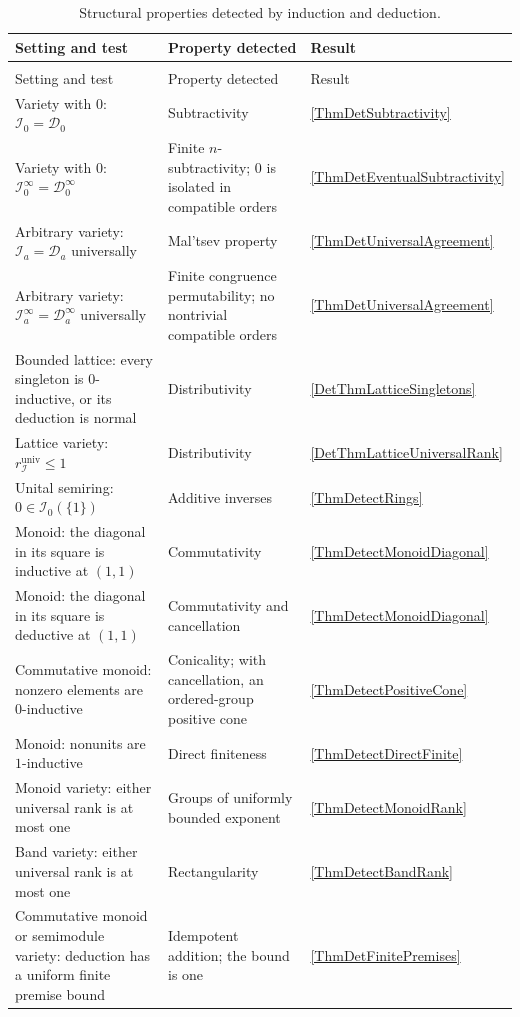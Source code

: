 \documentclass[12pt,english]{amsart}
\theoremstyle{definition}
\numberwithin{equation}{section}
\theoremstyle{remark}
\begin{document}
\begingroup
\small
\setlength{\tabcolsep}{4pt}
\setlength{\LTcapwidth}{\textwidth}
\renewcommand{\arraystretch}{1.12}
\makeatletter
{}
\makeatother
\begin{longtable}{@{}>{\raggedright\arraybackslash}p{}>{\raggedright\arraybackslash}p{}l@{}}
\caption{Structural properties detected by induction and deduction.}
\label{TabDetection}\\
\toprule
Setting and test & Property detected & Result\\
\midrule
\endfirsthead
\multicolumn{3}{l}{\textit{Table~\ref{TabDetection}, continued}}\\
\toprule
Setting and test & Property detected & Result\\
\midrule
\endhead
\bottomrule
\endfoot
Variety with $0$: $\mathcal I_0=\mathcal D_0$
 & Subtractivity & \ref{ThmDetSubtractivity}\\
Variety with $0$: $\mathcal I_0^\infty=\mathcal D_0^\infty$
 & Finite $n$-subtractivity; $0$ is isolated in compatible orders
 & \ref{ThmDetEventualSubtractivity}\\
Arbitrary variety: $\mathcal I_a=\mathcal D_a$ universally
 & Mal'tsev property & \ref{ThmDetUniversalAgreement}\\
Arbitrary variety: $\mathcal I_a^\infty=\mathcal D_a^\infty$ universally
 & Finite congruence permutability; no nontrivial compatible orders
 & \ref{ThmDetUniversalAgreement}\\
Bounded lattice: every singleton is $0$-inductive, or its deduction is normal
 & Distributivity & \ref{DetThmLatticeSingletons}\\
Lattice variety: $r_{\mathcal I}^{\mathrm{univ}}\leqslant1$
 & Distributivity & \ref{DetThmLatticeUniversalRank}\\
Unital semiring: $0\in\mathcal I_0(\{1\})$
 & Additive inverses & \ref{ThmDetectRings}\\
Monoid: the diagonal in its square is inductive at $(1,1)$
 & Commutativity & \ref{ThmDetectMonoidDiagonal}\\
Monoid: the diagonal in its square is deductive at $(1,1)$
 & Commutativity and cancellation & \ref{ThmDetectMonoidDiagonal}\\
Commutative monoid: nonzero elements are $0$-inductive
 & Conicality; with cancellation, an ordered-group positive cone
 & \ref{ThmDetectPositiveCone}\\
Monoid: nonunits are $1$-inductive
 & Direct finiteness & \ref{ThmDetectDirectFinite}\\
Monoid variety: either universal rank is at most one
 & Groups of uniformly bounded exponent & \ref{ThmDetectMonoidRank}\\
Band variety: either universal rank is at most one
 & Rectangularity & \ref{ThmDetectBandRank}\\
Commutative monoid or semimodule variety: deduction has a uniform finite premise bound
 & Idempotent addition; the bound is one & \ref{ThmDetFinitePremises}\\
\end{longtable}
\end{document}
